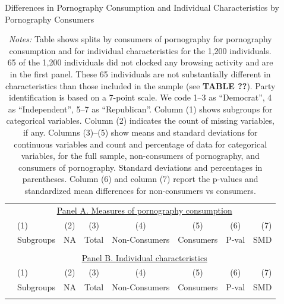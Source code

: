 \documentclass[12pt, letterpaper]{article}
\begin{document}
\begin{table}[ht] \centering \small \setlength\tabcolsep{5 pt}
	\caption{Differences in Pornography Consumption and Individual Characteristics by Pornography Consumers}
	\label{tab:characteristics_split_by_porn_consumers}
	\begin{adjustbox}{max width=\textwidth}
		\begin{tabular}{@{\hspace{0\tabcolsep}}llrcccrr@{\hspace{0\tabcolsep}}}
			\toprule
			&\multicolumn{7}{c}{\underline{Panel A. Measures of pornography consumption}}\\
			&\multicolumn{1}{l}{(1)}&\multicolumn{1}{c}{(2)}&\multicolumn{1}{c}{(3)}&\multicolumn{1}{c}{(4)}&\multicolumn{1}{c}{(5)}&\multicolumn{1}{c}{(6)}&\multicolumn{1}{r}{(7)}\\			
			&\multicolumn{1}{l}{Subgroups}&\multicolumn{1}{c}{NA}&\multicolumn{1}{c}{Total}&\multicolumn{1}{c}{Non-Consumers}&\multicolumn{1}{c}{Consumers}&\multicolumn{1}{c}{P-val}&\multicolumn{1}{r}{SMD}\\
			\cmidrule{2-8}
			\\
			\cmidrule{2-8}
			&\multicolumn{7}{c}{\underline{Panel B. Individual characteristics}}\\
			&\multicolumn{1}{l}{(1)}&\multicolumn{1}{c}{(2)}&\multicolumn{1}{c}{(3)}&\multicolumn{1}{c}{(4)}&\multicolumn{1}{c}{(5)}&\multicolumn{1}{c}{(6)}&\multicolumn{1}{r}{(7)}\\			
			&\multicolumn{1}{l}{Subgroups}&\multicolumn{1}{c}{NA}&\multicolumn{1}{c}{Total}&\multicolumn{1}{c}{Non-Consumers}&\multicolumn{1}{c}{Consumers}&\multicolumn{1}{c}{P-val}&\multicolumn{1}{r}{SMD}\\
			\cmidrule{2-8}
			\\
			\bottomrule
		\end{tabular}
	\end{adjustbox}
	\caption*{\scriptsize \emph{Notes:}
		Table shows splits by consumers of pornography for pornography consumption and for individual characteristics for the 1,200 individuals.
		65 of the 1,200 individuals did not clocked any browsing activity and are in the first panel.
		These 65 individuals are not substantially different in characteristics than those included in the sample (see \textbf{TABLE ??}).
		Party identification is based on a 7-point scale. We code 1--3 as ``Democrat'', 4 as ``Independent'', 5--7 as ``Republican''.
		Column (1) shows subgroups for categorical variables.
		Column (2) indicates the count of missing variables, if any.
		Columns (3)--(5) show means and standard deviations for continuous variables and count and percentage of data for categorical variables, for the full sample, non-consumers of pornography, and consumers of pornography.
		Standard deviations and percentages in parentheses.
		Column (6) and column (7) report the p-values and standardized mean differences for non-consumers vs consumers.
	}
\end{table}
\end{document}

